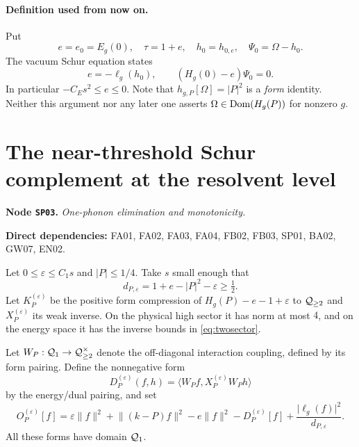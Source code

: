 \documentclass[11pt,a4paper]{article}
\theoremstyle{remark}\newtheorem{remark}[theorem]{Remark}
\newcommand{\ip}[2]{\langle #1,#2\rangle}\newcommand{\norm}[1]{\lVert #1\rVert}
\newcommand{\abs}[1]{\lvert #1\rvert}\newcommand{\rankone}[2]{\lvert #1\rangle\langle #2\rvert}
\newcommand{\node}[3]{\par\Needspace{6\baselineskip}\smallskip\hypertarget{node:#1}{}\label{nodepage:#1}\noindent\textbf{Node \texttt{#1}.} \textit{#2.}\par\noindent\textbf{Direct dependencies:} #3.\par}
\begin{document}
\paragraph{Definition used from now on.}
Put
\[
 e=e_0=E_g(0),\quad \tau=1+e,\quad h_0=h_{0,e},\quad\Psi_0=\Omega-h_0.
\]
The vacuum Schur equation states
\begin{equation}
 e=-\ell_g(h_0),\qquad (H_g(0)-e)\Psi_0=0.\label{eq:groundidentities}
\end{equation}
In particular $-C_Es^2\leq e\leq0$. Note that $h_{g,P}[\Omega]=\abs P^2$ is a \emph{form} identity. Neither this argument nor any later one asserts $\Omega\in\operatorname{Dom}(H_g(P))$ for nonzero $g$.

\section{The near-threshold Schur complement at the resolvent level}\label{sec:onephonon}
\node{SP03}{One-phonon elimination and monotonicity}{FA01, FA02, FA03, FA04, FB02, FB03, SP01, BA02, GW07, EN02}
Let $0\leq\varepsilon\leq C_1s$ and $\abs P\leq1/4$. Take $s$ small enough that
\begin{equation}
 d_{P,\varepsilon}=1+e-\abs P^2-\varepsilon\geq\tfrac12.\label{eq:vacdenom}
\end{equation}
Let $K^{(\varepsilon)}_P$ be the positive form compression of $H_g(P)-e-1+\varepsilon$ to $\mathcal Q_{\geq2}$ and $X^{(\varepsilon)}_P$ its weak inverse. On the physical high sector it has norm at most $4$, and on the energy space it has the inverse bounds in \eqref{eq:twosector}.

Let $W_P:\mathcal Q_1\to\mathcal Q_{\geq2}^{\times}$ denote the off-diagonal interaction coupling, defined by its form pairing. Define the nonnegative form
\[
 D_P^{(\varepsilon)}(f,h)=\ip{W_P f}{X_P^{(\varepsilon)}W_P h}
\]
by the energy/dual pairing, and set
\begin{equation}
 O_P^{(\varepsilon)}[f]=\varepsilon\norm f^2+\norm{(k-P)f}^2-e\norm f^2
 -D_P^{(\varepsilon)}[f]+\frac{\abs{\ell_g(f)}^2}{d_{P,\varepsilon}}.
 \label{eq:onephonon}
\end{equation}
All these forms have domain $\mathcal Q_1$.
\end{document}
